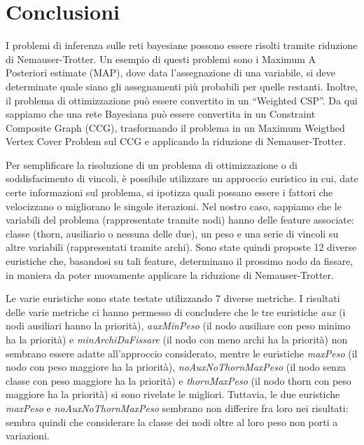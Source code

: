\section{Conclusioni}
\label{sec:conclusioni}

I problemi di inferenza sulle reti bayesiane possono essere risolti tramite riduzione di Nemauser-Trotter. Un esempio di questi problemi sono i Maximum A Posteriori estimate (MAP), dove data l'assegnazione di una variabile, si deve determinate quale siano gli assegnamenti più probabili per quelle restanti. Inoltre, il problema di ottimizzazione può essere convertito in un ``Weighted CSP''. Da qui sappiamo che una rete Bayesiana può essere convertita in un Constraint Composite Graph (CCG), trasformando il problema in un Maximum Weigthed Vertex Cover Problem sul CCG e applicando la riduzione di Nemauser-Trotter.

Per semplificare la risoluzione di un problema di ottimizzazione o di soddisfacimento di vincoli, è possibile utilizzare un approccio euristico in cui, date certe informazioni sul problema, si ipotizza quali possano essere i fattori che velocizzano o migliorano le singole iterazioni. Nel nostro caso, sappiamo che le variabili del problema (rappresentate tramite nodi) hanno delle feature associate: classe (thorn, ausiliario o nessuna delle due), un peso e una serie di vincoli su altre variabili (rappresentati tramite archi). Sono state quindi proposte 12 diverse euristiche che, basandosi su tali feature, determinano il prossimo nodo da fissare, in maniera da poter nuovamente applicare la riduzione di Nemauser-Trotter.

Le varie euristiche sono state testate utilizzando 7 diverse metriche. I risultati delle varie metriche ci hanno permesso di concludere che le tre euristiche \textit{aux} (i nodi ausiliari hanno la priorità), \textit{auxMinPeso} (il nodo ausiliare con peso minimo ha la priorità) e \textit{minArchiDaFissare} (il nodo con meno archi ha la priorità) non sembrano essere adatte all'approccio considerato, mentre le euristiche \textit{maxPeso} (il nodo con peso maggiore ha la priorità), \textit{noAuxNoThornMaxPeso} (il nodo senza classe con peso maggiore ha la priorità)
 e \textit{thornMaxPeso} (il nodo thorn con peso maggiore ha la priorità) si sono rivelate le migliori. Tuttavia, le due euristiche \textit{maxPeso} e \textit{noAuxNoThornMaxPeso} sembrano non differire fra loro nei risultati: sembra quindi che considerare la classe dei nodi oltre al loro peso non porti a variazioni. 

